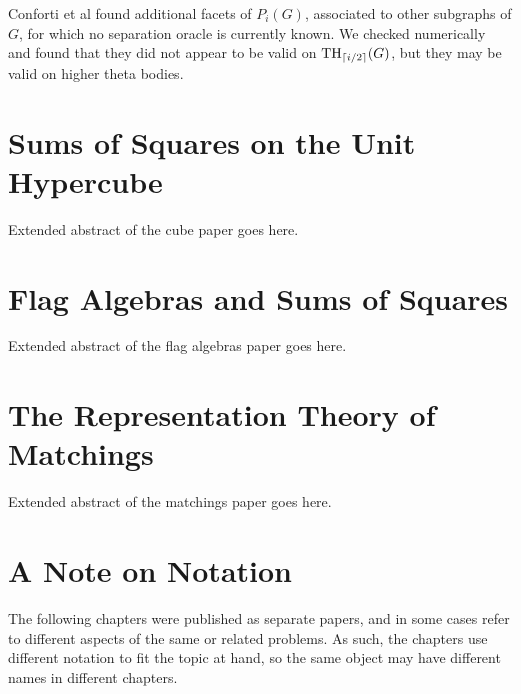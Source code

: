 Conforti et al \cite{conforti} found additional facets of $P_i(G)$, associated to other subgraphs of $G$, for which no separation oracle is currently known. 
We checked numerically and found that they did not appear to be valid on $\textup{TH}_{\lceil i/2\rceil}(G)$, but they may be valid on higher theta bodies.




\section{Sums of Squares on the Unit Hypercube}

Extended abstract of the cube paper goes here.

\section{Flag Algebras and Sums of Squares}

Extended abstract of the flag algebras paper goes here.

\section{The Representation Theory of Matchings}

Extended abstract of the matchings paper goes here.

\section{A Note on Notation}
The following chapters were published as separate papers, and in some cases refer to different aspects of the same or related problems. 
As such, the chapters use different notation to fit the topic at hand, so the same object may have different names in different chapters.
